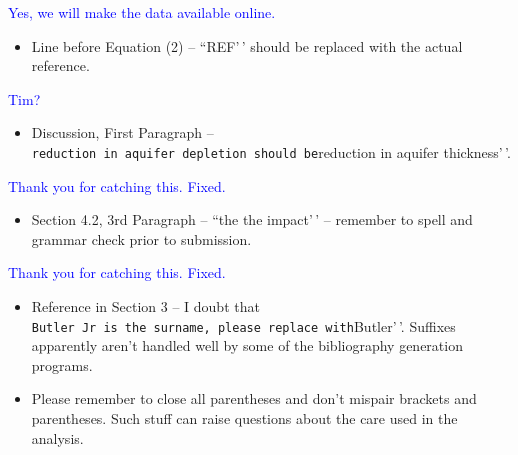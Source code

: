 \documentclass[
]{article}
\providecommand{\tightlist}{%
  \setlength{\itemsep}{0pt}\setlength{\parskip}{0pt}}
\begin{document}
\textcolor{blue}{Yes, we will make the data available online.}

\begin{itemize}
\tightlist
\item
  Line before Equation (2) -- ``REF'\,' should be replaced with the
  actual reference.
\end{itemize}

\textcolor{blue}{Tim?}

\begin{itemize}
\tightlist
\item
  Discussion, First Paragraph --
  \texttt{reduction\ in\ aquifer\ depletion\textquotesingle{}\textquotesingle{}\ should\ be}reduction
  in aquifer thickness'\,'.
\end{itemize}

\textcolor{blue}{Thank you for catching this. Fixed.}

\begin{itemize}
\tightlist
\item
  Section 4.2, 3rd Paragraph -- ``the the impact'\,' -- remember to
  spell and grammar check prior to submission.
\end{itemize}

\textcolor{blue}{Thank you for catching this. Fixed.}

\begin{itemize}
\tightlist
\item
  Reference in Section 3 -- I doubt that
  \texttt{Butler\ Jr\textquotesingle{}\textquotesingle{}\ is\ the\ surname,\ please\ replace\ with}Butler'\,'.
  Suffixes apparently aren't handled well by some of the bibliography
  generation programs.
\end{itemize}

\textcolor{blue}{}

\begin{itemize}
\tightlist
\item
  Please remember to close all parentheses and don't mispair brackets
  and parentheses. Such stuff can raise questions about the care used in
  the analysis.
\end{itemize}
\end{document}
